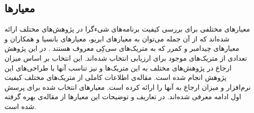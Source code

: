 \subsection{معیارها}
 معیارهای مختلفی برای بررسی کیفیت برنامه‌های شیءگرا در پژوهش‌های مختلف ارائه شده‌اند که از آن جمله می‌توان به معیارهای ابریو\cite{quality_metrics_1,quality_metrics_2}، معیارهای بانسیا و همکاران\cite{quality_metrics_3} و معیارهای چیدامبر و کمرر که به متریک‌های سی‌کِی معروف هستند \cite{quality_metrcs_ck}. در این پژوهش تعدادی از متریک‌های موجود برای ارزیابی انتخاب شده‌اند. این انتخاب بر اساس میزان ارجاع در پژوهش‌های مختلف به این متریک‌ها و نیز تناسب آنها با طراحی‌های این پژوهش انجام شده است. مقاله‌ی \cite{metrics_stateOfTheArt} اطلاعات کاملی از متریک‌های مختلف کیفیت نرم‌افزار و میزان ارجاع به آنها را ارائه کرده است. معیارهای انتخاب شده برای پرسش اول ادامه معرفی شده‌اند. در تعاریف و توضیحات این معیارها از مقاله‌ی \cite{metrics_stateOfTheArt} بهره گرفته شده است.
